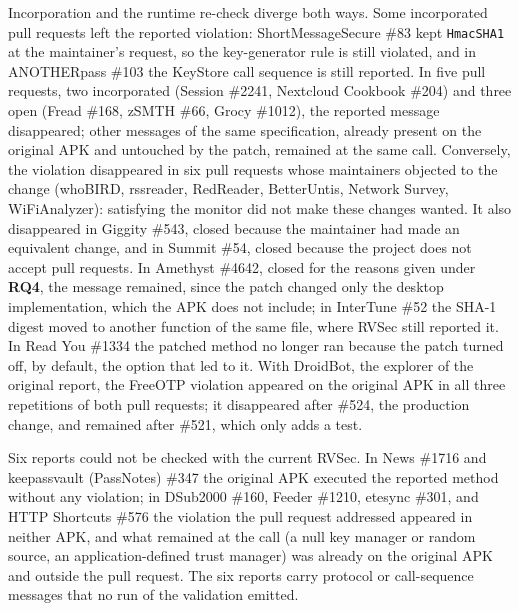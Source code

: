 \documentclass[conference]{IEEEtran}
\newcommand{\researchq}[1]{\textbf{RQ#1}}
\begin{document}
Incorporation and the runtime re-check diverge both ways. Some incorporated
pull requests left the reported violation: ShortMessageSecure \#83 kept \texttt{HmacSHA1} at the maintainer's request, so
the key-generator rule is still violated, and in ANOTHERpass \#103 the KeyStore
call sequence is still reported. In five pull requests, two incorporated (Session \#2241,
Nextcloud Cookbook \#204) and three open (Fread \#168, zSMTH \#66, Grocy
\#1012), the reported message disappeared; other messages of the same specification, already present on the
original APK and untouched by the patch, remained at the same call.
Conversely, the violation disappeared in six pull requests whose maintainers
objected to the change (whoBIRD, rssreader, RedReader, BetterUntis, Network
Survey, WiFiAnalyzer): satisfying the monitor did not make these changes
wanted. It also disappeared in Giggity \#543, closed because the maintainer had
made an equivalent change, and in Summit \#54, closed because the project does
not accept pull requests. In Amethyst \#4642, closed for the reasons given under \researchq{4},
the message remained, since the patch changed only the desktop implementation,
which the APK does not include; in InterTune \#52 the SHA-1 digest moved to another function of the
same file, where RVSec still reported it. In Read You \#1334 the patched
method no longer ran because the patch turned off, by default, the option that
led to it.
With DroidBot, the explorer of the original report, the FreeOTP violation
appeared on the original APK in all three repetitions of both pull requests;
it disappeared after \#524, the production change, and remained after \#521,
which only adds a test.

Six reports could not be checked with the current RVSec. In News \#1716 and
keepassvault (PassNotes) \#347 the original APK executed the reported method without any
violation; in DSub2000 \#160, Feeder \#1210, etesync \#301, and HTTP Shortcuts
\#576 the violation the pull request addressed appeared in neither APK, and
what remained at the call (a null key manager or random source, an
application-defined trust manager) was already on the original APK and outside
the pull request. The six reports carry protocol or call-sequence messages that
no run of the validation emitted.
\end{document}
